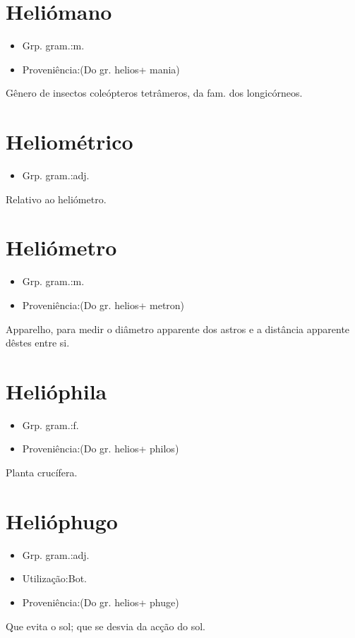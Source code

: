 \documentclass{article}
\begin{document}
\section{Heliómano}
\begin{itemize}
\item {Grp. gram.:m.}
\end{itemize}
\begin{itemize}
\item {Proveniência:(Do gr. \textunderscore helios\textunderscore  + \textunderscore mania\textunderscore )}
\end{itemize}
Gênero de insectos coleópteros tetrâmeros, da fam. dos longicórneos.
\section{Heliométrico}
\begin{itemize}
\item {Grp. gram.:adj.}
\end{itemize}
Relativo ao heliómetro.
\section{Heliómetro}
\begin{itemize}
\item {Grp. gram.:m.}
\end{itemize}
\begin{itemize}
\item {Proveniência:(Do gr. \textunderscore helios\textunderscore  + \textunderscore metron\textunderscore )}
\end{itemize}
Apparelho, para medir o diâmetro apparente dos astros e a distância apparente dêstes entre si.
\section{Helióphila}
\begin{itemize}
\item {Grp. gram.:f.}
\end{itemize}
\begin{itemize}
\item {Proveniência:(Do gr. \textunderscore helios\textunderscore  + \textunderscore philos\textunderscore )}
\end{itemize}
Planta crucífera.
\section{Helióphugo}
\begin{itemize}
\item {Grp. gram.:adj.}
\end{itemize}
\begin{itemize}
\item {Utilização:Bot.}
\end{itemize}
\begin{itemize}
\item {Proveniência:(Do gr. \textunderscore helios\textunderscore  + \textunderscore phuge\textunderscore )}
\end{itemize}
Que evita o sol; que se desvia da acção do sol.
\end{document}
